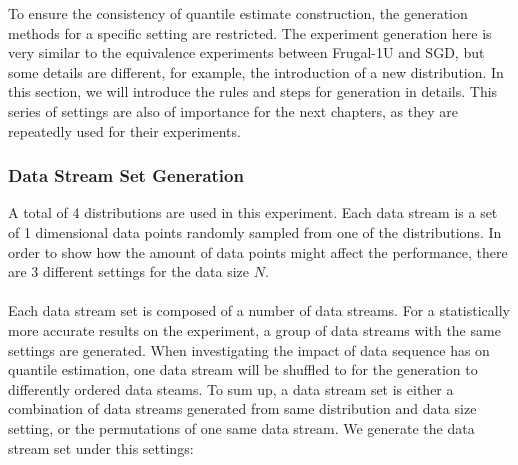 To ensure the consistency of quantile estimate construction, the generation methods for a specific setting are restricted.
The experiment generation here is very similar to the equivalence experiments between Frugal-1U and SGD, but some details are different, for example, the introduction of a new distribution. 
In this section, we will introduce the rules and steps for generation in details.
This series of settings are also of importance for the next chapters, as they are repeatedly used for their experiments.

\subsubsection{Data Stream Set Generation}
A total of 4 distributions are used in this experiment.
Each data stream is a set of 1 dimensional data points randomly sampled from one of the distributions. In order to show how the amount of data points might affect the performance, there are 3 different settings for the data size $N$. 
\\\\
Each data stream set is composed of a number of data streams. For a statistically more accurate results on the experiment, a group of data streams with the same settings are generated. When investigating the impact of data sequence has on quantile estimation, one data stream will be shuffled to for the generation to differently ordered data steams. To sum up, a data stream set is either a combination of data streams generated from same distribution and data size setting, or the permutations of one same data stream. We generate the data stream set under this settings:

